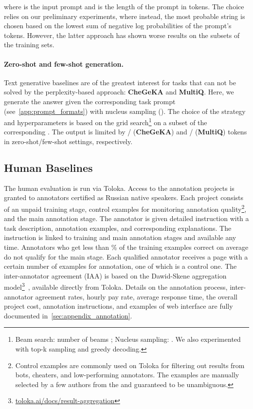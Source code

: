 \documentclass[11pt]{article}
\begin{document}
\vspace{-0.5cm}



\noindent where  is the input prompt and  is the length of the prompt in tokens. The choice relies on our preliminary experiments, where instead, the most probable string is chosen based on the lowest sum of negative log probabilities of the prompt's tokens. However, the latter approach has shown worse results on the subsets of the training sets.

\paragraph{Zero-shot and few-shot generation.} Text generative baselines are of the greatest interest for tasks that can not be solved by the perplexity-based approach: \textbf{CheGeKA} and \textbf{MultiQ}. Here, we generate the answer given the corresponding task prompt (see~\autoref{app:prompt_formats}) with nucleus sampling (). The choice of the strategy and hyperparameters is based on the grid search\footnote{Beam search: number of beams ; Nucleus sampling: . We also experimented with top-k sampling and greedy decoding.} on a subset of the corresponding . The output is limited by / (\textbf{CheGeKA}) and / (\textbf{MultiQ}) tokens in zero-shot/few-shot settings, respectively.


\subsection{Human Baselines}
The human evaluation is run via Toloka. Access to the annotation projects is granted to annotators certified as Russian native speakers. Each project consists of an unpaid training stage, control examples for monitoring annotation quality\footnote{Control examples are commonly used on Toloka for filtering out results from bots, cheaters, and low-performing annotators. The examples are manually selected by a few authors from the  and guaranteed to be unambiguous.}, and the main annotation stage. The annotator is given detailed instruction with a task description, annotation examples, and corresponding explanations. The instruction is linked to training and main annotation stages and available any time. Annotators who get less than \% of the training examples correct on average do not qualify for the main stage. Each qualified annotator receives a page with a certain number of examples for annotation, one of which is a control one. The inter-annotator agreement (IAA) is based on the Dawid-Skene aggregation model\footnote{\href{https://toloka.ai/docs/guide/concepts/result-aggregation.html}{toloka.ai/docs/result-aggregation}}~\cite{dawid1979maximum}, available directly from Toloka. Details on the annotation process, inter-annotator agreement rates, hourly pay rate, average response time, the overall project cost, annotation instructions, and examples of web interface are fully documented in~\autoref{sec:appendix_annotation}.
\end{document}

